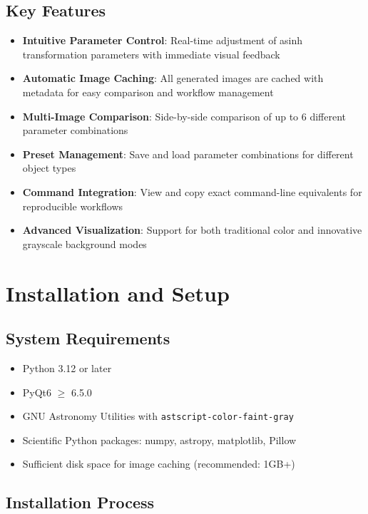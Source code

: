 \documentclass[11pt,a4paper]{article}
\begin{document}
\subsection{Key Features}

\begin{itemize}[leftmargin=*]
\item \textbf{Intuitive Parameter Control}: Real-time adjustment of asinh
transformation parameters with immediate visual feedback
\item \textbf{Automatic Image Caching}: All generated images are cached
with metadata for easy comparison and workflow management
\item \textbf{Multi-Image Comparison}: Side-by-side comparison of up to 6
different parameter combinations
\item \textbf{Preset Management}: Save and load parameter combinations for
different object types
\item \textbf{Command Integration}: View and copy exact command-line
equivalents for reproducible workflows
\item \textbf{Advanced Visualization}: Support for both traditional color
and innovative grayscale background modes
\end{itemize}

\section{Installation and Setup}

\subsection{System Requirements}

\begin{itemize}[leftmargin=*]
\item Python 3.12 or later
\item PyQt6 $\geq$ 6.5.0
\item GNU Astronomy Utilities with \texttt{astscript-color-faint-gray}
\item Scientific Python packages: numpy, astropy, matplotlib, Pillow
\item Sufficient disk space for image caching (recommended: 1GB+)
\end{itemize}

\subsection{Installation Process}
\end{document}
